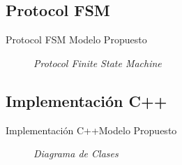 \subsection{Protocol FSM}
\begin{frame}{Protocol FSM}	{Modelo Propuesto}
    \begin{figure}				
		\caption{\small \sl Protocol Finite State Machine}
		\label{figure:ProtocolFSM}
    \end{figure}
\end{frame}
\subsection{Implementación C++}
\begin{frame}{Implementación C++}{Modelo Propuesto}
    \begin{figure}				
		\caption{\small \sl Diagrama de Clases}
		\label{figure:DiagramaClases}
    \end{figure}
\end{frame}
